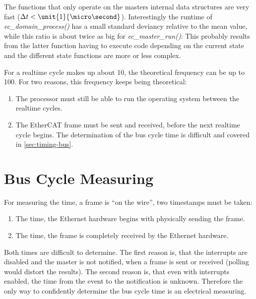 \documentclass[a4paper,12pt,BCOR=6mm,bibtotoc,idxtotoc]{scrbook}
\begin{document}
The functions that only operate on the masters internal data structures are
very fast ($\Delta t < \unit{1}{\micro\second}$). Interestingly the runtime of
\textit{ec\_domain\_process()} has a small standard deviancy relative to the
mean value, while this ratio is about twice as big for
\textit{ec\_master\_run()}: This probably results from the latter function
having to execute code depending on the current state and the different state
functions are more or less complex.

For a realtime cycle makes up about \unit{10}{\micro\second}, the theoretical
frequency can be up to \unit{100}{\kilo\hertz}. For two reasons, this frequency
keeps being theoretical:

\begin{enumerate}

\item The processor must still be able to run the operating system between the
realtime cycles.

\item The EtherCAT frame must be sent and received, before the next realtime
cycle begins. The determination of the bus cycle time is difficult and covered
in \autoref{sec:timing-bus}.

\end{enumerate}


\section{Bus Cycle Measuring}
\label{sec:timing-bus}

For measuring the time, a frame is ``on the wire'', two timestamps must be
taken:

\begin{enumerate}

\item The time, the Ethernet hardware begins with physically sending the
frame.

\item The time, the frame is completely received by the Ethernet hardware.

\end{enumerate}

Both times are difficult to determine. The first reason is, that the
interrupts are disabled and the master is not notified, when a frame is sent
or received (polling would distort the results). The second reason is, that
even with interrupts enabled, the time from the event to the notification is
unknown. Therefore the only way to confidently determine the bus cycle time is
an electrical measuring.
\end{document}
